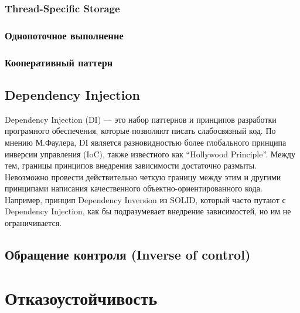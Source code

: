 \subsection{Thread-Specific Storage}
\subsection{Однопоточное выполнение}
\subsection{Кооперативный паттерн}

\section{Dependency Injection}
Dependency Injection (DI) — это набор паттернов и принципов разработки програмного обеспечения, которые позволяют писать слабосвязный код. По мнению М.Фаулера, DI является разновидностью более глобального принципа инверсии управления (IoC), также известного как “Hollywood Principle”. Между тем, границы принципов внедрения зависимости достаточно размыты. Невозможно провести действительно четкую границу между этим и другими принципами написания качественного объектно-ориентированного кода. Например, принцип Dependency Inversion из SOLID, который часто путают с Dependency Injection, как бы подразумевает внедрение зависимостей, но им не ограничивается.

\section{Обращение контроля (Inverse of control)}

\chapter{Отказоустойчивость}

